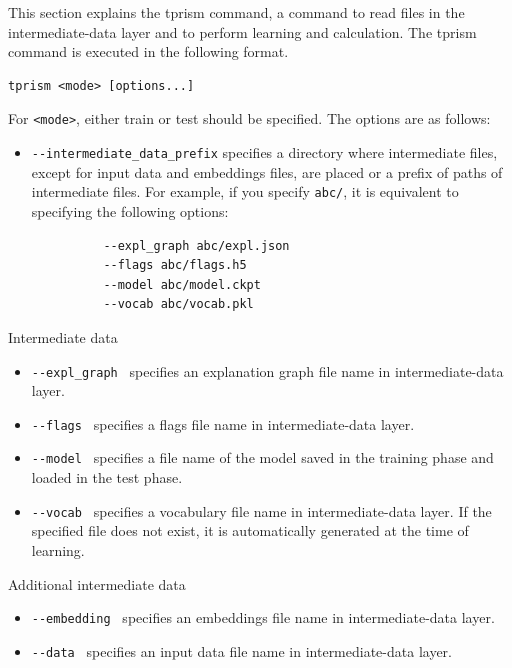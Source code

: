 \documentclass[a4paper]{report}
\begin{document}
This section explains the tprism command, a command to read files in the intermediate-data layer and to perform learning and calculation.
The tprism command is executed in the following format.
\begin{verbatim}
tprism <mode> [options...]
\end{verbatim}
For \verb|<mode>|, either train or test should be specified.
The options are as follows:
\begin{itemize}
	\item \verb|--intermediate_data_prefix|
specifies a directory where intermediate files, except for input data and embeddings files, are placed or a prefix of paths of intermediate files.
	For example, if you specify {\tt abc/}, it is equivalent to specifying the following options:
	\begin{verbatim}
		  --expl_graph abc/expl.json
		  --flags abc/flags.h5
		  --model abc/model.ckpt
		  --vocab abc/vocab.pkl
	\end{verbatim}
\end{itemize}

Intermediate data
\begin{itemize}
	\item \verb|--expl_graph | specifies an explanation graph file name in intermediate-data layer.	
	\item \verb|--flags | specifies a flags file name in intermediate-data layer.	
	\item \verb|--model | specifies a file name of the model saved in the training phase and loaded in the test phase.
	\item \verb|--vocab | specifies a vocabulary file name in intermediate-data layer.
	If the specified file does not exist, it is automatically generated at the time of learning.
\end{itemize}

Additional intermediate data
\begin{itemize}
	\item \verb|--embedding | specifies an embeddings file name in intermediate-data layer.
	\item \verb|--data | specifies an input data file name in intermediate-data layer.	
\end{itemize}
\end{document}
